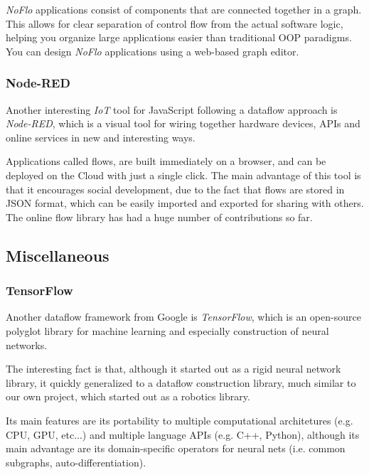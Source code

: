 \documentclass[sigplan,review,anonymous]{acmart}\settopmatter{printfolios=true,printacmref=false}
\begin{document}
\textit{NoFlo} applications consist of components that are connected together in a graph. This allows for clear separation of control flow from the actual software logic, helping you organize large applications easier than traditional OOP paradigms. You can design \textit{NoFlo} applications using a web-based graph editor.

\subsubsection{Node-RED}

Another interesting \textit{IoT} tool for JavaScript following a dataflow approach is \textit{Node-RED}\cite{node-red}, which is a visual tool for wiring together hardware devices, APIs and online services in new and interesting ways.

Applications called flows, are built immediately on a browser, and can be deployed on the Cloud with just a single click. The main advantage of this tool is that it encourages social development, due to the fact that flows are stored in JSON format, which can be easily imported and exported for sharing with others. The online flow library has had a huge number of contributions so far.

\subsection{Miscellaneous}

\subsubsection{TensorFlow}

Another dataflow framework from Google is \textit{TensorFlow}, which is an open-source polyglot library for machine learning and especially construction of neural networks.

The interesting fact is that, although it started out as a rigid neural network library, it quickly generalized to a dataflow construction library, much similar to our own project, which started out as a robotics library.

Its main features are its portability to multiple computational architetures (e.g. CPU, GPU, etc...) and multiple language APIs (e.g. C++, Python), although its main advantage are its domain-specific operators for neural nets (i.e. common subgraphs, auto-differentiation).
\end{document}
